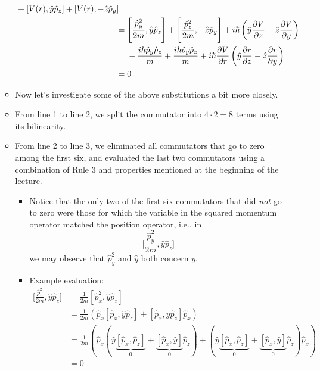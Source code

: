 \documentclass[../notes.tex]{subfiles}
\begin{document}
\begin{itemize}
\begin{itemize}
\begin{align*}
\begin{split}
                & +[V(r),\hat{y}\hat{p}_z]+[V(r),-\hat{z}\hat{p}_y]
            \end{split}\\
            ={}& \Bigg[ \frac{\hat{p}_y^2}{2m},\hat{y}\hat{p}_z \Bigg]+\Bigg[ \frac{\hat{p}_z^2}{2m},-\hat{z}\hat{p}_y \Bigg]+i\hbar\left( \hat{y}\pdv{V}{z}-\hat{z}\pdv{V}{y} \right)\\
            ={}& -\frac{i\hbar\hat{p}_y\hat{p}_z}{m}+\frac{i\hbar\hat{p}_y\hat{p}_z}{m}+i\hbar\pdv{V}{r}\left( \hat{y}\pdv{r}{z}-\hat{z}\pdv{r}{y} \right)\\
            ={}& 0
        \end{align*}
        \item Now let's investigate some of the above substitutions a bit more closely.
        \item From line 1 to line 2, we split the commutator into $4\cdot 2=8$ terms using its bilinearity.
        \item From line 2 to line 3, we eliminated all commutators that go to zero among the first six, and evaluated the last two commutators using a combination of Rule 3 and properties mentioned at the beginning of the lecture.
        \begin{itemize}
            \item Notice that the only two of the first six commutators that did \emph{not} go to zero were those for which the variable in the squared momentum operator matched the position operator, i.e., in
            \begin{equation*}
                \Bigg[ \frac{\hat{p}_y^2}{2m},\hat{y}\hat{p}_z \Bigg]
            \end{equation*}
            we may observe that $\hat{p}_y^2$ and $\hat{y}$ both concern $y$.
            \item Example evaluation:
            \begin{align*}
                \Bigg[ \frac{\hat{p}_x^2}{2m},\hat{y}\hat{p}_z \Bigg] &= \frac{1}{2m}[\hat{p}_x^2,\hat{y}\hat{p}_z]\tag*{Rule 4}\\
                &= \frac{1}{2m}(\hat{p}_x[\hat{p}_x,\hat{y}\hat{p}_z]+[\hat{p}_x,\hat{y}\hat{p}_z]\hat{p}_x)\tag*{Rule 1}\\
                &= \frac{1}{2m}(\hat{p}_x(\hat{y}\underbrace{[\hat{p}_x,\hat{p}_z]}_0+\underbrace{[\hat{p}_x,\hat{y}]}_0\hat{p}_z)+(\hat{y}\underbrace{[\hat{p}_x,\hat{p}_z]}_0+\underbrace{[\hat{p}_x,\hat{y}]}_0\hat{p}_z)\hat{p}_x)\tag*{Rule 3}\\
                &= 0

\end{align*}
\end{itemize}
\end{itemize}
\end{itemize}
\end{document}
